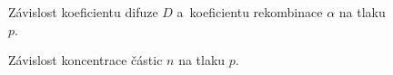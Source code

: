 \documentclass{protokol}
\newcommand\dens{n}
\newcommand\pres{p}
\newcommand\diffuse{D}
\newcommand\recomb{\alpha}
\begin{document}
\begin{figure}[htp]
	\centering
	
	
	\caption{Závislost koeficientu difuze $\diffuse$
		a~koeficientu rekombinace $\recomb$ na tlaku $\pres$.}
	\label{fig:diffuse-recomb-pres}
\end{figure}

\begin{figure}[htp]
	\centering
	
	\caption{Závislost koncentrace částic $\dens$ na tlaku $\pres$.}
	\label{fig:density-pres}
\end{figure}
\end{document}
